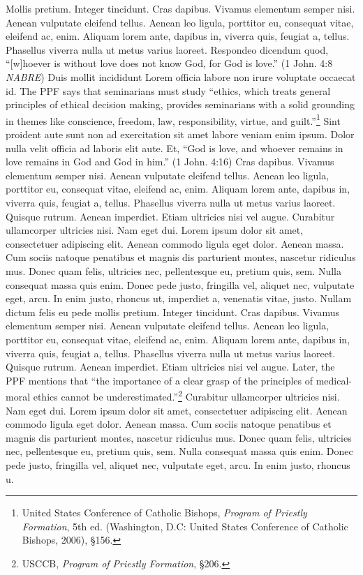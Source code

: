 \documentclass[
    12pt,
    letterpaper,
    oneside,
    noraggedright
]{turabian-researchpaper}
\begin{document}
Mollis pretium. Integer tincidunt. Cras dapibus. Vivamus elementum
semper nisi. Aenean vulputate eleifend tellus. Aenean leo ligula,
porttitor eu, consequat vitae, eleifend ac, enim. Aliquam lorem ante,
dapibus in, viverra quis, feugiat a, tellus. Phasellus viverra nulla ut
metus varius laoreet. Respondeo dicendum quod, ``{[}w{]}hoever is
without love does not know God, for God is love.'' {(1 John. 4:8{
\emph{NABRE}})} Duis mollit incididunt Lorem officia labore non irure
voluptate occaecat id. The PPF says that seminarians must study
``ethics, which treats general principles of ethical decision making,
provides seminarians with a solid grounding in themes like conscience,
freedom, law, responsibility, virtue, and guilt.''\footnote{United
  States Conference of Catholic Bishops, \emph{Program of Priestly
  Formation}, 5th ed. (Washington, D.C: United States Conference of
  Catholic Bishops, 2006), §156.} Sint proident aute sunt non ad
exercitation sit amet labore veniam enim ipsum. Dolor nulla velit
officia ad laboris elit aute. Et, ``God is love, and whoever remains in
love remains in God and God in him.'' {(1 John. 4:16)} Cras dapibus.
Vivamus elementum semper nisi. Aenean vulputate eleifend tellus. Aenean
leo ligula, porttitor eu, consequat vitae, eleifend ac, enim. Aliquam
lorem ante, dapibus in, viverra quis, feugiat a, tellus. Phasellus
viverra nulla ut metus varius laoreet. Quisque rutrum. Aenean imperdiet.
Etiam ultricies nisi vel augue. Curabitur ullamcorper ultricies nisi.
Nam eget dui. Lorem ipsum dolor sit amet, consectetuer adipiscing elit.
Aenean commodo ligula eget dolor. Aenean massa. Cum sociis natoque
penatibus et magnis dis parturient montes, nascetur ridiculus mus. Donec
quam felis, ultricies nec, pellentesque eu, pretium quis, sem. Nulla
consequat massa quis enim. Donec pede justo, fringilla vel, aliquet nec,
vulputate eget, arcu. In enim justo, rhoncus ut, imperdiet a, venenatis
vitae, justo. Nullam dictum felis eu pede mollis pretium. Integer
tincidunt. Cras dapibus. Vivamus elementum semper nisi. Aenean vulputate
eleifend tellus. Aenean leo ligula, porttitor eu, consequat vitae,
eleifend ac, enim. Aliquam lorem ante, dapibus in, viverra quis, feugiat
a, tellus. Phasellus viverra nulla ut metus varius laoreet. Quisque
rutrum. Aenean imperdiet. Etiam ultricies nisi vel augue. Later, the PPF
mentions that ``the importance of a clear grasp of the principles of
medical-moral ethics cannot be underestimated.''\footnote{USCCB, \emph{Program
  of Priestly Formation}, §206.} Curabitur ullamcorper ultricies nisi.
Nam eget dui. Lorem ipsum dolor sit amet, consectetuer adipiscing elit.
Aenean commodo ligula eget dolor. Aenean massa. Cum sociis natoque
penatibus et magnis dis parturient montes, nascetur ridiculus mus. Donec
quam felis, ultricies nec, pellentesque eu, pretium quis, sem. Nulla
consequat massa quis enim. Donec pede justo, fringilla vel, aliquet nec,
vulputate eget, arcu. In enim justo, rhoncus u.
\end{document}

